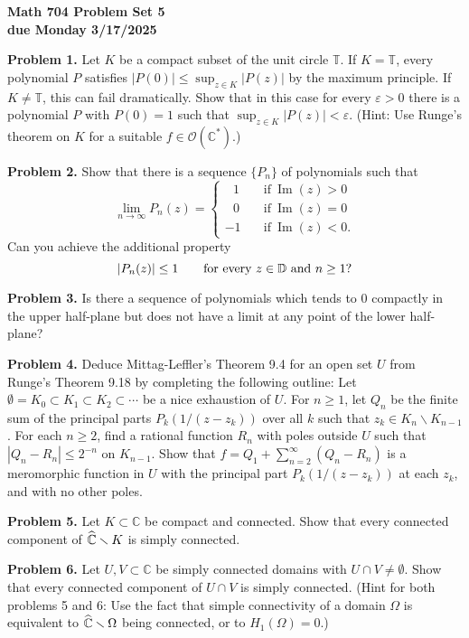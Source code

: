 \documentclass[12pt]{amsart}
\newcommand{\ve}{\varepsilon}
\newcommand{\es}{\emptyset}
\newcommand{\sm}{\smallsetminus}
\newcommand{\Chat}{\widehat{\Bbb C}}
\newcommand{\myim}{\operatorname{Im}}
\newcommand{\OO}{{\mathcal O}}
\newcommand{\CC}{{\mathbb C}}
\newcommand{\TT}{{\mathbb T}}
\newcommand{\DD}{{\mathbb D}}
\newcommand{\vs}{\vspace{2mm}}
\newcommand{\Cstar}{{\mathbb  C}^*}
\begin{document}
\begin{center}
{\bf \large Math 704 Problem Set 5} \vs \\
{\bf due Monday 3/17/2025} \vs \vs
\end{center}

\noindent
{\bf Problem 1.} Let $K$ be a compact subset of the unit circle $\TT$. If $K=\TT$, every polynomial $P$ satisfies $|P(0)| \leq \sup_{z \in K} |P(z)|$ by the maximum principle. If $K \neq \TT$, this can fail dramatically. Show that in this case for every $\ve>0$ there is a polynomial $P$ with $P(0)=1$ such that $\sup_{z \in K} |P(z)|<\ve$. (Hint: Use Runge's theorem on $K$ for a suitable $f \in \OO(\Cstar)$.) \vs

\noindent
{\bf Problem 2.} Show that there is a sequence $\{ P_n \}$ of polynomials such that
$$
\lim_{n \to \infty} P_n(z)= \begin{cases} \ \ \ 1 & \quad \text{if} \ \myim(z)>0 \\
\ \ \ 0 & \quad \text{if} \ \myim(z)=0 \\
-1 & \quad \text{if} \ \myim(z)<0.
\end{cases}
$$
Can you achieve the additional property
$$
|P_n(z)| \leq 1 \qquad \text{for every} \ z \in \DD \ \text{and} \ n \geq 1? \vs
$$

\noindent
{\bf Problem 3.} Is there a sequence of polynomials which tends to $0$ compactly in the upper half-plane but does not have a limit at any point of the lower half-plane? \vs  

\noindent
{\bf Problem 4.} Deduce Mittag-Leffler's Theorem 9.4 for an open set $U$ from Runge's Theorem 9.18 by completing the following outline: Let $\es = K_0 \subset K_1 \subset K_2 \subset \cdots$ be a nice exhaustion of $U$. For $n \geq 1$, let $Q_n$ be the finite sum of the principal parts $P_k(1/(z-z_k))$ over all $k$ such that $z_k \in K_n \sm K_{n-1}$. For each $n \geq 2$, find a rational function $R_n$ with poles outside $U$  such that $|Q_n-R_n| \leq 2^{-n}$ on $K_{n-1}$. Show that $f=Q_1+\sum_{n=2}^{\infty} (Q_n-R_n)$ is a meromorphic function in $U$ with the principal part $P_k(1/(z-z_k))$ at each $z_k$, and with no other poles. \vs 

\noindent
{\bf Problem 5.} Let $K \subset \CC$ be compact and connected. Show that every connected component of $\Chat \sm K$ is simply connected. \vs

\noindent
{\bf Problem 6.} Let $U,V \subset \CC$ be simply connected domains with $U \cap V \neq \es$. Show that every connected component of $U \cap V$ is simply connected. (Hint for both problems 5 and 6: Use the fact that simple connectivity of a domain $\Omega$ is equivalent to $\Chat \sm \Omega$ being connected, or to $H_1(\Omega)=0$.) 
\end{document}
